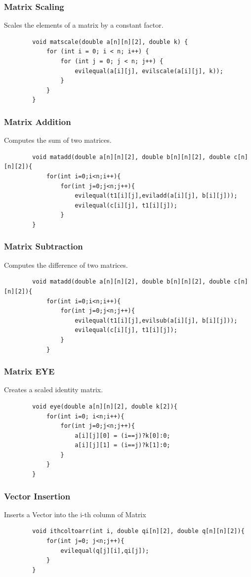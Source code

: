 \documentclass[12pt]{article}
\begin{document}
	\subsubsection{Matrix Scaling}
	Scales the elements of a matrix by a constant factor.
	\begin{lstlisting}
		void matscale(double a[n][n][2], double k) {
			for (int i = 0; i < n; i++) {
				for (int j = 0; j < n; j++) {
					evilequal(a[i][j], evilscale(a[i][j], k));
				}
			}
		}
	\end{lstlisting}
	
	\subsubsection{Matrix Addition}
	
	Computes the sum of two matrices.
	\begin{lstlisting}
		void matadd(double a[n][n][2], double b[n][n][2], double c[n][n][2]){
			for(int i=0;i<n;i++){
				for(int j=0;j<n;j++){
					evilequal(t1[i][j],eviladd(a[i][j], b[i][j]));
					evilequal(c[i][j], t1[i][j]);
				}
		}
	\end{lstlisting}
	\subsubsection{Matrix Subtraction}
	Computes the difference of two matrices.
	\begin{lstlisting}
		void matadd(double a[n][n][2], double b[n][n][2], double c[n][n][2]){
			for(int i=0;i<n;i++){
				for(int j=0;j<n;j++){
					evilequal(t1[i][j],evilsub(a[i][j], b[i][j]));
					evilequal(c[i][j], t1[i][j]);
				}
			}
		\end{lstlisting}
	\subsubsection{Matrix EYE}
	Creates a scaled identity matrix.
	\begin{lstlisting}
		void eye(double a[n][n][2], double k[2]){
			for(int i=0; i<n;i++){
				for(int j=0;j<n;j++){
					a[i][j][0] = (i==j)?k[0]:0;
					a[i][j][1] = (i==j)?k[1]:0;
				}
			}
		}
		\end{lstlisting}
	\subsubsection{Vector Insertion}
	Inserts a Vector into the i-th column of Matrix
	\begin{lstlisting}
		void ithcoltoarr(int i, double qi[n][2], double q[n][n][2]){
			for(int j=0; j<n;j++){
				evilequal(q[j][i],qi[j]);
			}
		}
		\end{lstlisting}
\end{document}
